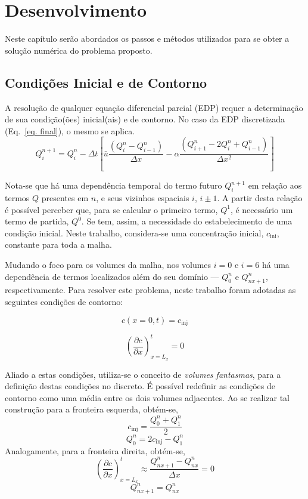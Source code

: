 \chapter{Desenvolvimento}
Neste capítulo serão abordados os passos e métodos utilizados para se obter a
solução numérica do problema proposto.

\section{Condições Inicial e de Contorno}
A resolução de qualquer equação diferencial parcial (EDP) requer a determinação
de sua condição(ões) inicial(ais) e de contorno. No caso da EDP discretizada
(Eq.\ \ref{eq. final}), o mesmo se aplica.
\[
    Q_i^{n+1} = Q_i^n - \Delta t
    \left[
    \bar{u}\frac{(Q_i^n - Q_{i-1}^n)}{\Delta x}
    -
    \alpha\frac{(Q_{i+1}^n - 2Q_i^n + Q_{i-1}^n)}{\Delta x^2}
    \right]
\]

Nota-se que há uma dependência temporal do termo futuro $Q_i^{n+1}$ em relação
aos termos $Q$ presentes em $n$, e seus vizinhos espaciais $i$, ${i\pm1}$. A
partir desta relação é possível perceber que, para se calcular o primeiro
termo, $Q^1$, é necessário um termo de partida, $Q^0$. Se tem, assim, a
necessidade do estabelecimento de uma condição inicial. Neste trabalho,
considera-se uma concentração inicial, $c_{\text{ini}}$, constante para toda a
malha.

Mudando o foco para os volumes da malha, nos volumes $i=0$ e $i=6$ há uma
dependência de termos localizados além do seu domínio --- $Q_0^n$ e
$Q_{nx+1}^n$, respectivamente. Para resolver este problema, neste trabalho
foram adotadas as seguintes condições de contorno:

\noindent
\begin{minipage}{.5\linewidth}
    \begin{equation}
        c(x=0,t) = c_{\text{inj}}
    \end{equation}
\end{minipage}%
\begin{minipage}{.5\linewidth}
    \begin{equation}
        \left(\frac{\partial c}{\partial x}\right)_{x=L_x}^t = 0
    \end{equation}
\end{minipage}

\bigskip

Aliado a estas condições, utiliza-se o conceito de \emph{volumes fantasmas},
para a definição destas condições no discreto. É possível redefinir as
condições de contorno como uma média entre os dois volumes adjacentes. Ao se
realizar tal construção para a fronteira esquerda, obtém-se,
\[
    c_{\text{inj}} = \frac{Q_0^n + Q_1^n}{2}
\]
\begin{equation}\label{cont. esq}
    Q_0^n = 2c_{\text{inj}} - Q_1^n
\end{equation}
Analogamente, para a fronteira direita, obtém-se,
\[
  \left(\frac{\partial c}{\partial x}\right)_{x=L_x}^t
  \approx
  \frac{Q_{nx+1}^n - Q_{nx}^n}{\Delta x} = 0
\]
\begin{equation}\label{cont. dir}
    Q_{nx+1}^n = Q_{nx}^n
\end{equation}

